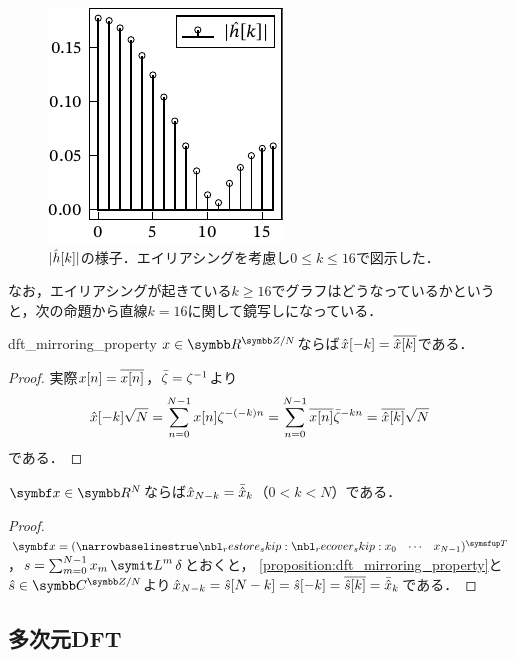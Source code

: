 \documentclass[../../main]{subfiles}
\begin{document}
\begin{figure}[htbp]
  \centering
  \includegraphics{figures/filter_characteristics.pdf}
  \caption{\(\lvert\hat{h}[k]\rvert\)の様子．エイリアシングを考慮し\(0\leq k\leq 16\)で図示した．}
  \label{figure:filter_characteristics}
\end{figure}

なお，エイリアシングが起きている\(k\geq 16\)でグラフはどうなっているかというと，次の命題から直線\(k=16\)に関して鏡写しになっている．

\begin{proposition}{}{dft_mirroring_property}
  \(x\in\cycles{\numset{R}}{N}\)ならば\(\hat{x}[-k]=\conj*{\hat{x}[k]}\)である．
\end{proposition}

\begin{proof}
  実際\(x[n]=\conj*{x[n]}\)，\(\conj{\zeta}=\zeta^{-1}\)より
  \[
    \hat{x}[-k]\sqrt{N} = \sum_{n=0}^{N-1}x[n]\zeta^{-(-k)n}
    = \sum_{n=0}^{N-1}\conj*{x[n]}\conj{\zeta}^{-kn}
    = \conj*{\hat{x}[k]}\sqrt{N}
  \]
  である．
\end{proof}

\begin{corollary}{}{}
  \(\vect{x}\in\numset{R}^N\)ならば\(\hat{x}_{N-k}=\conj{\hat{x}}_k\)（\(0<k<N\)）である．
\end{corollary}

\begin{proof}
  \(\vect{x}=\trps{\rowvect{x_0 & \cdots & x_{N-1}}}\)，\(s=\sum_{m=0}^{N-1}x_m\lagop^m\delta\)とおくと，
  \cref{proposition:dft_mirroring_property}と\(\hat{s}\in\cycles{\numset{C}}{N}\)より\(\hat{x}_{N-k}=\hat{s}[N-k]=\hat{s}[-k]=\conj*{\hat{s}[k]}=\conj{\hat{x}}_k\)である．
\end{proof}

\subsection{多次元DFT}
\end{document}

